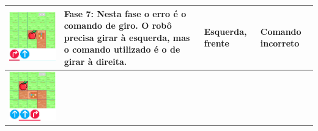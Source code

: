 \begin{quadro}[htbp]
\begin{longtable}{ | m{} | m{} | m{} | m{} |}
         \includegraphics[width=.9\linewidth]{figs/debug/2.png} &
     
         \textbf{Fase 7}: 
         Nesta fase o erro é o comando de giro. O robô precisa girar à esquerda, mas o comando utilizado é o de girar à direita. &
 
         Esquerda, frente & Comando incorreto
         
         \\ \hline
     
     
         \includegraphics[width=.9\linewidth]{figs/debug/3.png} &
     

\end{longtable}
\end{quadro}
